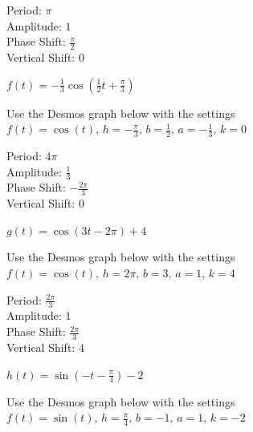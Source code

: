\documentclass{ximera}
\begin{document}
\begin{question}
\begin{problem}
\begin{solution}
Period: $\pi$\\
Amplitude: $1$\\
Phase Shift: $\frac{\pi}{2}$\\
Vertical Shift: $0$\\
\end{solution}
\end{problem}

\begin{problem}
$f(t)  = -\frac{1}{3}\cos \left( \frac{1}{2}t + \frac{\pi}{3} \right)$

\begin{solution}
Use the Desmos graph below with the settings $f(t)=\cos(t),\,h=-\frac{\pi}{3},\,b=\frac{1}{2},\,a=-\frac{1}{3},\,k=0$

\begin{center} 
\end{center}

Period: $4\pi$\\
Amplitude: $\frac{1}{3}$\\
Phase Shift: $-\frac{2\pi}{3}$\\
Vertical Shift: $0$\\
\end{solution}
\end{problem}

\begin{problem}
$g(t) = \cos (3t - 2\pi) + 4$

\begin{solution}
Use the Desmos graph below with the settings $f(t)=\cos(t),\,h=2\pi,\,b=3,\,a=1,\,k=4$

\begin{center} 
\end{center}

Period: $\frac{2\pi}{3}$\\
Amplitude: $1$\\
Phase Shift:  $\frac{2\pi}{3}$\\
Vertical Shift: 4\\
\end{solution}
\end{problem}

\begin{problem}
$h(t)  = \sin \left( -t - \frac{\pi}{4} \right) - 2$

\begin{solution}
Use the Desmos graph below with the settings $f(t)=\sin(t),\,h=\frac{\pi}{4},\,b=-1,\,a=1,\,k=-2$


\end{solution}
\end{problem}
\end{question}
\end{document}
